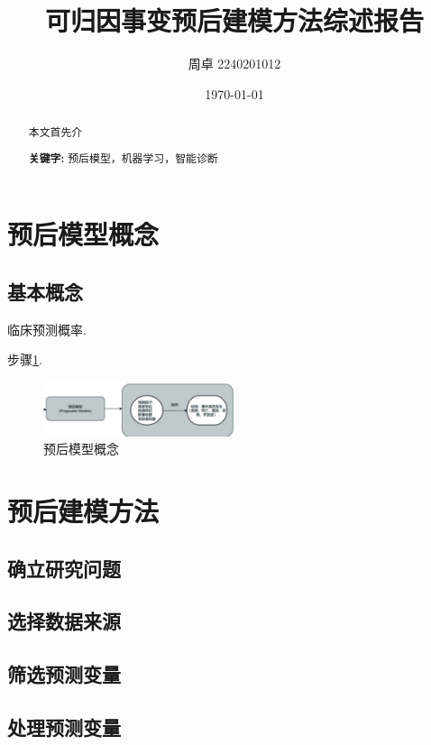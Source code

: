 \documentclass{article}
\begin{document}
\title{可归因事变预后建模方法综述报告}
\author{周卓 2240201012}
\date{\today}
\maketitle

\begin{abstract}
    本文首先介
    
    \textbf{关键字:} 预后模型，机器学习，智能诊断
\end{abstract}

\newpage
{}
\tableofcontents
\newpage
{}

\section{预后模型概念}
    \subsection{基本概念}
    临床预测概率\cite{chen2020overview}.

    步骤\ref{fig:a}.
    \begin{figure}[h]
        \centering
        \includegraphics[width=0.5\textwidth]{2fig/a.png}
        \caption{预后模型概念}
        \label{fig:a}
    \end{figure}
    
\section{预后建模方法}
    \subsection{确立研究问题}
    
    
    \subsection{选择数据来源}

    \subsection{筛选预测变量}
   
    \subsection{处理预测变量}
    
\end{document}
